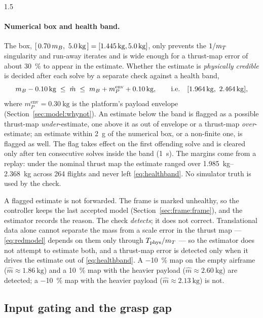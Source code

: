 \begin{spacing}{1.5}
\paragraph{Numerical box and health band.} The box,
$[\,0.70\,\mB,\ \SI{5.0}{\kg}\,]=[\SI{1.445}{\kg},\SI{5.0}{\kg}]$, only prevents
the $1/m_T$ singularity and run-away iterates and is wide enough for a thrust-map
error of about \SI{30}{\percent} to appear in the estimate. Whether the estimate
is \emph{physically credible} is decided after each solve by a separate check
against a health band,
\begin{equation}
\mB - \SI{0.10}{\kg} \;\le\; \hat m \;\le\; \mB + m_P^{\mathrm{env}} + \SI{0.10}{\kg},
\qquad \text{i.e.}\quad [\SI{1.964}{\kg},\ \SI{2.464}{\kg}],
\label{eq:healthband}
\end{equation}
where $m_P^{\mathrm{env}}=\SI{0.30}{\kg}$ is the platform's payload envelope
(Section~\ref{sec:model:whynot}). An estimate below the band is flagged as a
possible thrust-map \emph{under}-estimate, one above it as out of envelope or a
thrust-map \emph{over}-estimate; an estimate within \SI{2}{\gram} of the numerical
box, or a non-finite one, is flagged as well. The flag takes effect on the first
offending solve and is cleared only after ten consecutive solves inside the band
(\SI{1}{\second}). The margins come from a replay: under the nominal thrust map
the estimate ranged over \SIrange{1.985}{2.368}{\kg} across 264 flights
and never left \eqref{eq:healthband}. No simulator truth is used by the check.

A flagged estimate is not forwarded. The frame is marked unhealthy, so the
controller keeps the last accepted model (Section~\ref{sec:frame:frame}), and the
estimator records the reason. The check \emph{detects}; it does not correct.
Translational data alone cannot separate the mass from a scale error in the thrust
map --- \eqref{eq:redmodel} depends on them only through $T_{\mathrm{phys}}/m_T$ --- so the
estimator does not attempt to estimate both, and a thrust-map error is detected
only when it drives the estimate out of \eqref{eq:healthband}. A \SI{-10}{\percent}
map on the empty airframe ($\hat m\approx\SI{1.86}{\kg}$) and a \SI{+10}{\percent}
map with the heavier payload ($\hat m\approx\SI{2.60}{\kg}$) are detected; a
\SI{-10}{\percent} map with the heavier payload ($\hat m\approx\SI{2.13}{\kg}$)
is not.

\subsection{Input gating and the grasp gap}\label{sec:frame:gate}


\end{spacing}
